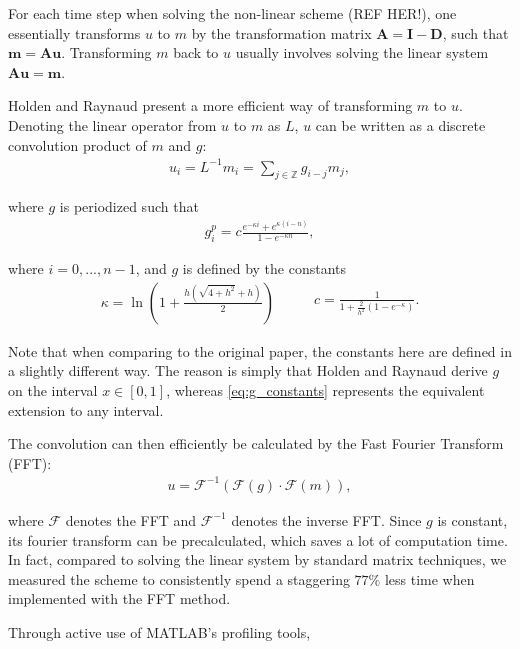 For each time step when solving the non-linear scheme (REF HER!), one essentially transforms $u$ to $m$ by the transformation matrix $\bm{A} = \bm{I - D}$, such that $\bm{m} = \bm{Au}$. Transforming $m$ back to $u$ usually involves solving the linear system $\bm{Au} = \bm{m}$. 

Holden and Raynaud \cite{holden2006convergence} present a more efficient way of transforming $m$ to $u$. Denoting the linear operator from $u$ to $m$ as $L$, $u$ can be written as a discrete convolution product of $m$ and $g$:
\begin{align*}
u_i = L^{-1} m_i = \sum\limits_{j \in \mathds{Z}} g_{i - j} m_j,
\end{align*}

where $g$ is periodized such that
\begin{align*}
g_i^p = c \frac{e^{-\kappa i} + e^{\kappa (i - n)}}{1 - e^{-\kappa n}},
\end{align*}

where $i = 0, ..., n - 1$, and $g$ is defined by the constants
\begin{equation}
\label{eq:g_constants}
\begin{aligned}
\kappa = \ln \left( 1 + \frac{h(\sqrt{4 + h^2} + h)}{2} \right)
\end{aligned}
\qquad
\begin{aligned}
c = \frac{1}{1 + \frac{2}{h^2} (1 - e^{-\kappa})}.
\end{aligned}
\end{equation}

Note that when comparing to the original paper, the constants here are defined in a slightly different way. The reason is simply that Holden and Raynaud derive $g$ on the interval $x \in [0, 1]$, whereas \eqref{eq:g_constants} represents the equivalent extension to any interval.

The convolution can then efficiently be calculated by the Fast Fourier Transform (FFT):
\begin{align*}
u = \mathcal{F}^{-1} (\mathcal{F} (g) \cdot \mathcal{F}(m)),
\end{align*}

where $\mathcal{F}$ denotes the FFT and $\mathcal{F}^{-1}$ denotes the inverse FFT. Since $g$ is constant, its fourier transform can be precalculated, which saves a lot of computation time. In fact, compared to solving the linear system by standard matrix techniques, we measured the scheme to consistently spend a staggering $77\%$ less time when implemented with the FFT method.

Through active use of MATLAB's profiling tools, 